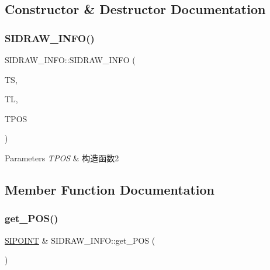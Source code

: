 \subsection{Constructor \& Destructor Documentation}
\mbox{\label{class_s_i_d_r_a_w___i_n_f_o_a48107d70e4071d1d925f722085876c3a}} 
\subsubsection{\texorpdfstring{S\+I\+D\+R\+A\+W\+\_\+\+I\+N\+F\+O()}{SIDRAW\_INFO()}}
{\footnotesize\ttfamily S\+I\+D\+R\+A\+W\+\_\+\+I\+N\+F\+O\+::\+S\+I\+D\+R\+A\+W\+\_\+\+I\+N\+FO (\begin{DoxyParamCaption}\item[{const \hyperlink{struct_s_i_r_e_c_t}{S\+I\+R\+E\+CT} \&}]{TS,  }\item[{const \hyperlink{struct_s_i_r_e_c_t}{S\+I\+R\+E\+CT} \&}]{TL,  }\item[{const \hyperlink{struct_s_i_p_o_i_n_t}{S\+I\+P\+O\+I\+NT} \&}]{T\+P\+OS }\end{DoxyParamCaption})\hspace{0.3cm}{\ttfamily [inline]}}


\begin{DoxyParams}{Parameters}
{\em T\+P\+OS} & 构造函数2 \\
\hline
\end{DoxyParams}


\subsection{Member Function Documentation}
\mbox{\label{class_s_i_d_r_a_w___i_n_f_o_aeca1707cc1e7e849f7e4e14f8ea36503}} 
\subsubsection{\texorpdfstring{get\+\_\+\+P\+O\+S()}{get\_POS()}}
{\footnotesize\ttfamily \hyperlink{struct_s_i_p_o_i_n_t}{S\+I\+P\+O\+I\+NT} \& S\+I\+D\+R\+A\+W\+\_\+\+I\+N\+F\+O\+::get\+\_\+\+P\+OS (\begin{DoxyParamCaption}{ }\end{DoxyParamCaption})\hspace{0.3cm}{\ttfamily [inline]}}



